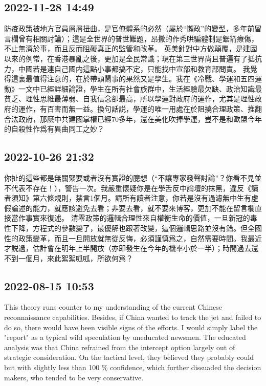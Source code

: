 \documentclass[twocolumn]{ctexart}
\begin{document}
\subsection*{2022-11-28 14:49}

防疫政策被地方官員層層扭曲，是官僚體系的必然（屬於“懶政”的變型，多年前留言欄曾有相關討論）；這是全世界的普世難題，昂撒的作秀哄騙體制是鋸箭療傷，不止無濟於事，而且反而阻礙真正的監管和改革。
英美針對中方做顛覆，是建國以來的例常，在香港暴亂之後，更加是全民常識；現在第三世界尚且普遍有了抵抗力，中國若是連自己國内這點小事都搞不定，只能找中宣部和教育部問責。
我覺得這裏最值得注意的，在於帶頭鬧事的果然又是學生。我在《冷戰、學運和五四運動》一文中已經詳細論證，學生在所有社會族群中，生活經驗最欠缺、政治知識最貧乏、理性思維最薄弱、自我信念卻最高，所以學運對政府的運作，尤其是理性政府的運作，有百害而無一益。換句話説，學運的唯一用處在於阻撓合理政策、推翻合法政府，那麽中共建國掌權已經70多年，還在美化吹捧學運，豈不是和歐盟今年的自殺性作爲有異曲同工之妙？
\subsection*{2022-10-26 21:32}

你扯的這些都是無關緊要或者沒有實證的臆想（“不讓專家發聲討論”？你看不見並不代表不存在！），警告一次。我嚴重懷疑你是在學舌反中論壇的抹黑，違反《讀者須知》第六條規則，禁言1個月。請所有讀者注意，你若是沒有過濾無中生有虛假論述的能力，就應該避免去看；非要去看，就不要來博客，更加不能在留言欄直接當作事實來復述。
清零政策的邏輯合理性來自權衡生命的價值，一旦新冠的毒性下降，方程式的參數變了，最優解也跟著改變，這個邏輯思路並沒有錯。但全國性的政策變革，而且一旦開放就無從反悔，必須謹慎爲之，自然需要時間。我最近才説過，估計會在明年上半開放（亦即發生在今年的機率小於一半）；時間過去還不到一個月，來此絮絮呱呱，所欲何爲？
\subsection*{2022-08-15 10:53}

This theory runs counter to my understanding of the current Chinese reconnaissance capabilities. Besides, if China wanted to track the jet and failed to do so, there would have been visible signs of the efforts. I would simply label the "report" as a typical wild speculation by uneducated newsmen. The educated analysis was that China refrained from the intercept option largely out of strategic consideration. On the tactical level, they believed they probably could but with slightly less than 100 \%  confidence, which further dissuaded the decision makers, who tended to be very conservative.
\end{document}
